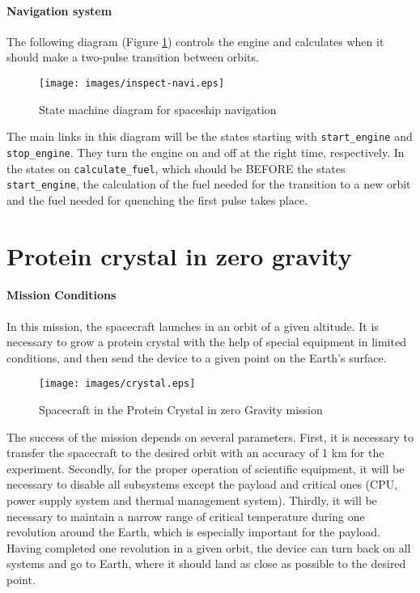 \documentclass[12pt,a4paper]{article}
\begin{document}
\clearpage

\paragraph{Navigation system} The following diagram (Figure \ref{Pic:INSPECT-navi-en}) controls the engine and calculates when it should make a two-pulse transition between orbits.

\begin{figure}[tbh]
  \begin{center}
    \texttt{[image: images/inspect-navi.eps]}
    \caption{State machine diagram for spaceship navigation}
    \label{Pic:INSPECT-navi-en}
  \end{center}
\end{figure}

The main links in this diagram will be the states starting with \verb'start_engine' and \verb'stop_engine'. They turn the engine on and off at the right time, respectively. In the states on \verb'calculate_fuel', which should be BEFORE the states \verb'start_engine', the calculation of the fuel needed for the transition to a new orbit and the fuel needed for quenching the first pulse takes place.


\section{Protein crystal in zero gravity}

\paragraph{Mission Conditions} In this mission, the spacecraft launches in an orbit of a given altitude. It is necessary to grow a protein crystal with the help of special equipment in limited conditions, and then send the device to a given point on the Earth's surface.

\begin{figure}[tbh]
  \begin{center}
    \texttt{[image: images/crystal.eps]}
    \caption{Spacecraft in the Protein Crystal in zero Gravity mission}
    \label{Pic:Crystal-en}
  \end{center}
\end{figure}

The success of the mission depends on several parameters. First, it is necessary to transfer the spacecraft to the desired orbit with an accuracy of 1 km for the experiment. Secondly, for the proper operation of scientific equipment, it will be necessary to disable all subsystems except the payload and critical ones (CPU, power supply system and thermal management system). Thirdly, it will be necessary to maintain a narrow range of critical temperature during one revolution around the Earth, which is especially important for the payload. Having completed one revolution in a given orbit, the device can turn back on all systems and go to Earth, where it should land as close as possible to the desired point.
\end{document}
